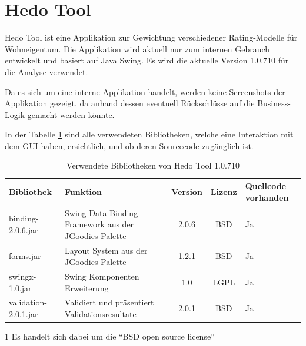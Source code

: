   \section{Hedo Tool}
  
  Hedo Tool ist eine Applikation zur Gewichtung verschiedener Rating-Modelle
  für Wohneigentum. Die Applikation wird aktuell nur zum internen Gebrauch
  entwickelt und basiert auf Java Swing. Es wird die aktuelle Version 1.0.710
  für die Analyse verwendet.
  
  Da es sich um eine interne Applikation handelt, werden keine Screenshots der
  Applikation gezeigt, da anhand dessen eventuell Rückschlüsse auf die
  Business-Logik gemacht werden könnte.
  
  In der Tabelle \ref{tab:bibliothekenHedoTool} sind alle verwendeten
  Bibliotheken, welche eine Interaktion mit dem \ac{GUI} haben, ersichtlich,
  und ob deren Sourcecode zugänglich ist.
  \newline
  
  \begin{table}[ht]
    \sffamily 
    \begin{center}
      \begin{threeparttable}
        \begin{tabular}{lp{4.5cm}ccp{2cm}}
          \toprule
          \textbf{Bibliothek} & \textbf{Funktion} & \textbf{Version} &
          \textbf{Lizenz} & \textbf{Quellcode vorhanden}\\
          \midrule
          binding-2.0.6.jar & Swing Data Binding Framework aus der JGoodies
          Palette & 2.0.6 & BSD\tnote{1} & Ja\\
          forms.jar & Layout System aus der JGoodies Palette & 1.2.1 &
          BSD\tnote{1} & Ja\\
          swingx-1.0.jar & Swing Komponenten Erweiterung & 1.0 & LGPL & Ja\\
          validation-2.0.1.jar & Validiert und präsentiert Validationsresultate
          & 2.0.1 & BSD\tnote{1} & Ja\\
          \bottomrule
        \end{tabular}
        \caption{Verwendete Bibliotheken von Hedo Tool 1.0.710}
        \label{tab:bibliothekenHedoTool}
        \begin{tablenotes}[++]\footnotesize 
          \item[1] Es handelt sich dabei um die ``BSD open source license''
        \end{tablenotes} 
      \end{threeparttable}
    \end{center}
  \end{table}
  
